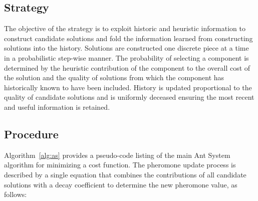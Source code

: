 \subsection{Strategy}
The objective of the strategy is to exploit historic and heuristic information to construct candidate solutions and fold the information learned from constructing solutions into the history.
Solutions are constructed one discrete piece at a time in a probabilistic step-wise manner. The probability of selecting a component is determined by the heuristic contribution of the component to the overall cost of the solution and the quality of solutions from which the component has historically known to have been included. History is updated proportional to the quality of candidate solutions and is uniformly deceased ensuring the most recent and useful information is retained.

\subsection{Procedure}
Algorithm~\ref{alg:as} provides a pseudo-code listing of the main Ant System algorithm for minimizing a cost function. 
The pheromone update process is described by a single equation that combines the contributions of all candidate solutions with a decay coefficient to determine the new pheromone value, as follows:

